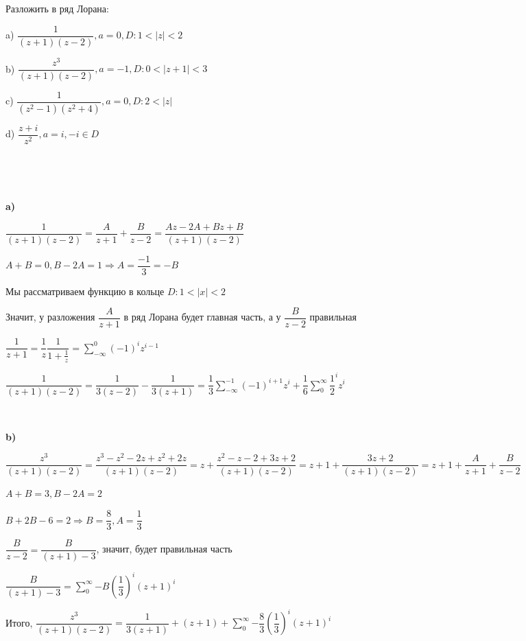 
\begin{problem}{1}

Разложить в ряд Лорана:

a) $\dfrac{1}{(z + 1)(z - 2)}, a = 0, D : 1 < |z| < 2$

b) $\dfrac{z^3}{(z + 1)(z - 2)}, a = -1, D : 0 < |z + 1| < 3$

c) $\dfrac{1}{(z^2 - 1)(z^2 + 4)}, a = 0, D : 2 < |z|$

d) $\dfrac{z + i}{z^2}, a = i, -i \in D$

\end{problem}

~\

~\

\begin{solution}

\textbf{a)} 

$\dfrac{1}{(z + 1)(z - 2)} = \dfrac{A}{z + 1} + \dfrac{B}{z - 2} = \dfrac{Az - 2A + Bz + B}{(z + 1)(z - 2)}$

$A + B = 0, B - 2A = 1 \Rightarrow A = \dfrac{-1}{3} = -B$

Мы рассматриваем функцию в кольце $D : 1 < |x| < 2$

Значит, у разложения $\dfrac{A}{z + 1}$ в ряд Лорана будет главная часть, а у $\dfrac{B}{z - 2}$ правильная

$ \dfrac{1}{z + 1} = \dfrac{1}{z} \dfrac{1}{1 + \frac{1}{z}} = \sum\limits_{-\infty}^0{(-1)^iz^{i - 1}}$

$\dfrac{1}{(z + 1)(z - 2)} = \dfrac{1}{3(z - 2)} - \dfrac{1}{3(z + 1)} = \dfrac{1}{3} \sum\limits_{-\infty}^{-1}{(-1)^{i + 1}z^i} + \dfrac{1}{6} \sum\limits_0^{\infty}{\dfrac{1}{2}^iz^i}$

~\

\textbf{b)} 

$\dfrac{z^3}{(z + 1)(z - 2)} = \dfrac{z^3 - z^2 - 2z + z^2 + 2z}{(z + 1)(z - 2)} = z + \dfrac{z^2 - z - 2 + 3z + 2}{(z + 1)(z - 2)} = z + 1 + \dfrac{3z + 2}{(z + 1)(z - 2)} = z + 1 + \dfrac{A}{z + 1} + \dfrac{B}{z - 2}$

$A + B = 3, B - 2A = 2$

$B + 2B - 6 = 2 \Rightarrow B = \dfrac{8}{3}, A = \dfrac{1}{3}$

$\dfrac{B}{z - 2} = \dfrac{B}{(z + 1) - 3}$, значит, будет правильная часть

$\dfrac{B}{(z + 1) - 3} = \sum\limits_0^\infty{-B
(\dfrac{1}{3})^i(z + 1)^i}$

Итого, $\dfrac{z^3}{(z + 1)(z - 2)} = \dfrac{1}{3(z + 1)} + (z + 1) + \sum\limits_0^\infty{-\dfrac{8}{3} (\dfrac{1}{3})^i(z + 1)^i}$


\end{solution}
